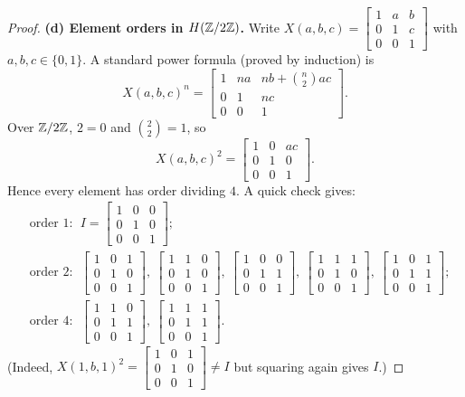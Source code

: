 \documentclass[12pt]{article}
\theoremstyle{definition}
\begin{document}
\begin{proof}
\smallskip
\textbf{(d) Element orders in $H(\Bbb Z/2\Bbb Z)$.} 
Write $X(a,b,c)=\begin{bmatrix}1&a&b\\ 0&1&c\\ 0&0&1\end{bmatrix}$ with $a,b,c\in\{0,1\}$.
A standard power formula (proved by induction) is
\[
X(a,b,c)^n=
\begin{bmatrix}
1& n a & n b + \binom{n}{2} a c\\[2pt]
0& 1 & n c\\[2pt]
0& 0 & 1
\end{bmatrix}.
\]
Over $\Bbb Z/2\Bbb Z$, $2=0$ and $\binom{2}{2}=1$, so
\[
X(a,b,c)^2=\begin{bmatrix}1&0&ac\\ 0&1&0\\ 0&0&1\end{bmatrix}.
\]
Hence every element has order dividing $4$. A quick check gives:
\[
\begin{aligned}
&\text{order }1:\ \ I=\begin{bmatrix}1&0&0\\ 0&1&0\\ 0&0&1\end{bmatrix};\\[4pt]
&\text{order }2:\ \ 
\begin{bmatrix}1&0&1\\ 0&1&0\\ 0&0&1\end{bmatrix},\
\begin{bmatrix}1&1&0\\ 0&1&0\\ 0&0&1\end{bmatrix},\
\begin{bmatrix}1&0&0\\ 0&1&1\\ 0&0&1\end{bmatrix},\
\begin{bmatrix}1&1&1\\ 0&1&0\\ 0&0&1\end{bmatrix},\
\begin{bmatrix}1&0&1\\ 0&1&1\\ 0&0&1\end{bmatrix};\\[6pt]
&\text{order }4:\ \ 
\begin{bmatrix}1&1&0\\ 0&1&1\\ 0&0&1\end{bmatrix},\
\begin{bmatrix}1&1&1\\ 0&1&1\\ 0&0&1\end{bmatrix}.
\end{aligned}
\]
(Indeed, $X(1,b,1)^2=\begin{bmatrix}1&0&1\\ 0&1&0\\ 0&0&1\end{bmatrix}\ne I$ but squaring again gives $I$.)


\end{proof}
\end{document}
